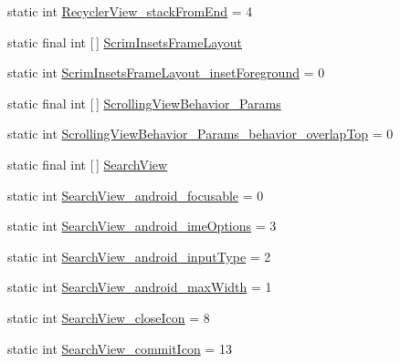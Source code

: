 \begin{DoxyCompactItemize}
\item 
static int \hyperlink{classandroid_1_1support_1_1v7_1_1cardview_1_1R_1_1styleable_af94123221870052541c69f6f043aa704}{Recycler\+View\+\_\+stack\+From\+End} = 4
\item 
static final int \mbox{[}$\,$\mbox{]} \hyperlink{classandroid_1_1support_1_1v7_1_1cardview_1_1R_1_1styleable_a985cd1ba52cab7e08da09a84b07a9d58}{Scrim\+Insets\+Frame\+Layout}
\item 
static int \hyperlink{classandroid_1_1support_1_1v7_1_1cardview_1_1R_1_1styleable_ab666cfd5d44681b7ad44530a1c3ac75b}{Scrim\+Insets\+Frame\+Layout\+\_\+inset\+Foreground} = 0
\item 
static final int \mbox{[}$\,$\mbox{]} \hyperlink{classandroid_1_1support_1_1v7_1_1cardview_1_1R_1_1styleable_adee7a6b56432df3dafacd56ba69c4e85}{Scrolling\+View\+Behavior\+\_\+\+Params}
\item 
static int \hyperlink{classandroid_1_1support_1_1v7_1_1cardview_1_1R_1_1styleable_a8502610687d8661c885b7d6838d9896a}{Scrolling\+View\+Behavior\+\_\+\+Params\+\_\+behavior\+\_\+overlap\+Top} = 0
\item 
static final int \mbox{[}$\,$\mbox{]} \hyperlink{classandroid_1_1support_1_1v7_1_1cardview_1_1R_1_1styleable_a6a300ecad88f70a7642265f73ff4d33f}{Search\+View}
\item 
static int \hyperlink{classandroid_1_1support_1_1v7_1_1cardview_1_1R_1_1styleable_a373cce5ff29cfc7b5f134b1c22ec9cf9}{Search\+View\+\_\+android\+\_\+focusable} = 0
\item 
static int \hyperlink{classandroid_1_1support_1_1v7_1_1cardview_1_1R_1_1styleable_a88aa7140c27a7ac4cbbf1fb9a313c348}{Search\+View\+\_\+android\+\_\+ime\+Options} = 3
\item 
static int \hyperlink{classandroid_1_1support_1_1v7_1_1cardview_1_1R_1_1styleable_aad762769d154383461f4a4017db66413}{Search\+View\+\_\+android\+\_\+input\+Type} = 2
\item 
static int \hyperlink{classandroid_1_1support_1_1v7_1_1cardview_1_1R_1_1styleable_a8ef58ace9eb6163c2db55365aeb93834}{Search\+View\+\_\+android\+\_\+max\+Width} = 1
\item 
static int \hyperlink{classandroid_1_1support_1_1v7_1_1cardview_1_1R_1_1styleable_a0cf54fb2b0b8469da1416f865524d537}{Search\+View\+\_\+close\+Icon} = 8
\item 
static int \hyperlink{classandroid_1_1support_1_1v7_1_1cardview_1_1R_1_1styleable_a866623cc5ff182b4597adf1f4472b817}{Search\+View\+\_\+commit\+Icon} = 13
\item 

\end{DoxyCompactItemize}
